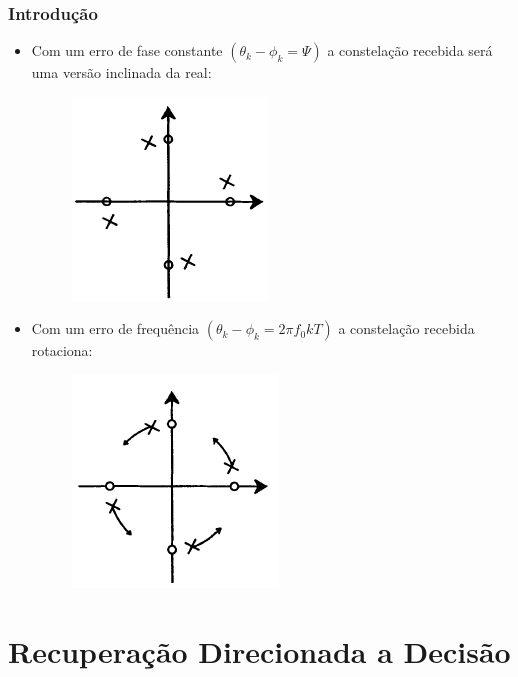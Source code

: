 \begin{frame}
	\frametitle{Introdução}
	\begin{itemize}
		\item Com um erro de fase constante $(\theta_k - \phi_k=\Psi)$ a constelação recebida será uma versão inclinada da real:
		\begin{figure}
			\includegraphics[width=0.2\columnwidth]{figs/inclidado}
		\end{figure}
		
		\item Com um erro de frequência $(\theta_k - \phi_k=2\pi f_0 k T)$ a constelação recebida rotaciona:
		
		\begin{figure}
			\includegraphics[width=0.2\columnwidth]{figs/rotacionando}
		\end{figure}
	\end{itemize}
	
\end{frame}

\section{Recuperação Direcionada a Decisão}

